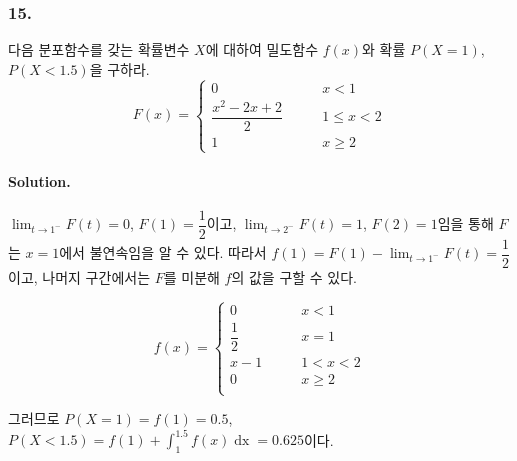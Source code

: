 \subsubsection{15.} 다음 분포함수를 갖는 확률변수 $X$에 대하여 밀도함수 $f\left(x\right)$와 확률 $P\left(X = 1\right)$, $P\left(X<1.5\right)$을 구하라.
\[F\left(x\right) = \left\{
\begin{array}{ll}
	0 & \qquad x < 1 \\
	\dfrac{x^2-2x+2}{2} & \qquad 1\leq x<2 \\
	1 & \qquad x\geq 2
\end{array}
\right. \]

\paragraph{Solution.} $\displaystyle \lim_{t\rightarrow 1^-}F\left(t\right)=0$, $F\left(1\right)=\dfrac{1}{2}$이고, $\displaystyle \lim_{t\rightarrow 2^-}F\left(t\right)=1$, $F\left(2\right)=1$임을 통해 $F$는 $x = 1$에서 불연속임을 알 수 있다. 따라서 $\displaystyle f\left(1\right)=F\left(1\right)-\lim_{t\rightarrow 1^-}F\left(t\right)=\dfrac{1}{2}$이고, 나머지 구간에서는 $F$를 미분해 $f$의 값을 구할 수 있다.

\[f\left(x\right) = \left\{
\begin{array}{ll}
	0 & \qquad x<1 \\
	\dfrac{1}{2} & \qquad x=1\\
	x - 1 & \qquad 1<x< 2\\
	0 & \qquad x\geq 2 \\
\end{array}
\right. \]

그러므로 $P\left(X = 1\right) = f\left(1\right) = 0.5$, $\displaystyle P\left(X<1.5\right) = f\left(1\right) + \int_1^{1.5} f\left(x\right) \mathop{dx} = 0.625$이다.